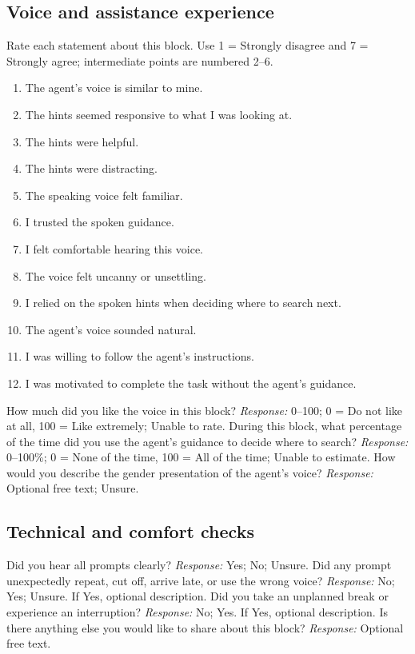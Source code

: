 \subsection{Voice and assistance experience}
Rate each statement about this block. Use 1 = Strongly disagree and 7 = Strongly agree; intermediate points are numbered 2--6.
\begin{enumerate}
\item The agent's voice is similar to mine.
\item The hints seemed responsive to what I was looking at.
\item The hints were helpful.
\item The hints were distracting.
\item The speaking voice felt familiar.
\item I trusted the spoken guidance.
\item I felt comfortable hearing this voice.
\item The voice felt uncanny or unsettling.
\item I relied on the spoken hints when deciding where to search next.
\item The agent's voice sounded natural.
\item I was willing to follow the agent's instructions.
\item I was motivated to complete the task without the agent's guidance.
\end{enumerate}
How much did you like the voice in this block?
\textit{Response:} 0--100; 0 = Do not like at all, 100 = Like extremely; Unable to rate.
During this block, what percentage of the time did you use the agent's guidance to decide where to search?
\textit{Response:} 0--100\%; 0 = None of the time, 100 = All of the time; Unable to estimate.
How would you describe the gender presentation of the agent's voice?
\textit{Response:} Optional free text; Unsure.
\subsection{Technical and comfort checks}
Did you hear all prompts clearly?
\textit{Response:} Yes; No; Unsure.
Did any prompt unexpectedly repeat, cut off, arrive late, or use the wrong voice?
\textit{Response:} No; Yes; Unsure. If Yes, optional description.
Did you take an unplanned break or experience an interruption?
\textit{Response:} No; Yes. If Yes, optional description.
Is there anything else you would like to share about this block?
\textit{Response:} Optional free text.
